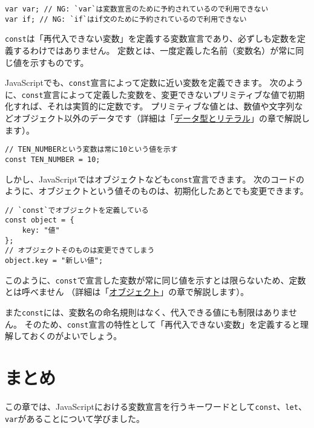 \begin{lstlisting}
var var; // NG: `var`は変数宣言のために予約されているので利用できない
var if; // NG: `if`はif文のために予約されているので利用できない
\end{lstlisting}

\begin{tcolorbox}[title=\texttt{const}は定数ではない]\label{const-is-not-constant}

\texttt{const}は「再代入できない変数」を定義する変数宣言であり、必ずしも定数を定義するわけではありません。
定数とは、一度定義した名前（変数名）が常に同じ値を示すものです。

JavaScriptでも、\texttt{const}宣言によって定数に近い変数を定義できます。
次のように、\texttt{const}宣言によって定義した変数を、変更できないプリミティブな値で初期化すれば、それは実質的に定数です。
プリミティブな値とは、数値や文字列などオブジェクト以外のデータです（詳細は「\href{../data-type/README.md}{データ型とリテラル}」の章で解説します）。

\begin{lstlisting}
// TEN_NUMBERという変数は常に10という値を示す
const TEN_NUMBER = 10;
\end{lstlisting}

しかし、JavaScriptではオブジェクトなども\texttt{const}宣言できます。
次のコードのように、オブジェクトという値そのものは、初期化したあとでも変更できます。

\begin{lstlisting}
// `const`でオブジェクトを定義している
const object = {
    key: "値"
};
// オブジェクトそのものは変更できてしまう
object.key = "新しい値";
\end{lstlisting}

このように、\texttt{const}で宣言した変数が常に同じ値を示すとは限らないため、定数とは呼べません
（詳細は「\href{../object/README.md\#const-and-object}{オブジェクト}」の章で解説します）。

また\texttt{const}には、変数名の命名規則はなく、代入できる値にも制限はありません。
そのため、\texttt{const}宣言の特性として「再代入できない変数」を定義すると理解しておくのがよいでしょう。
\end{tcolorbox}

\hypertarget{summary}{%
\section{まとめ}\label{summary}}

この章では、JavaScriptにおける変数宣言を行うキーワードとして\texttt{const}、\texttt{let}、\texttt{var}があることについて学びました。

